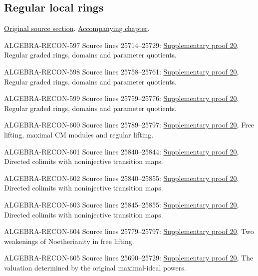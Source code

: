 \subsection{Regular local rings}
\hypertarget{algebra-source-section-regular}{}
\noindent\href{https://github.com/stacks/stacks-project/blob/a04446e57ec1fbc252a871afcec7752fb2807b14/algebra.tex\#L25679}{Original source section}. \href{algebra.pdf\#nameddest=section-regular}{Accompanying chapter}.

\begin{AlgebraSourceRoutes}
\item[ALGEBRA-RECON-597] Source lines 25714--25729: \hyperlink{algebra_catenary_regular_notes_20260928}{Supplementary proof 20}, Regular graded rings, domains and parameter quotients.
\item[ALGEBRA-RECON-598] Source lines 25758--25761: \hyperlink{algebra_catenary_regular_notes_20260928}{Supplementary proof 20}, Regular graded rings, domains and parameter quotients.
\item[ALGEBRA-RECON-599] Source lines 25759--25776: \hyperlink{algebra_catenary_regular_notes_20260928}{Supplementary proof 20}, Regular graded rings, domains and parameter quotients.
\item[ALGEBRA-RECON-600] Source lines 25789--25797: \hyperlink{algebra_catenary_regular_notes_20260928}{Supplementary proof 20}, Free lifting, maximal CM modules and regular lifting.
\item[ALGEBRA-RECON-601] Source lines 25840--25844: \hyperlink{algebra_catenary_regular_notes_20260928}{Supplementary proof 20}, Directed colimits with noninjective transition maps.
\item[ALGEBRA-RECON-602] Source lines 25840--25855: \hyperlink{algebra_catenary_regular_notes_20260928}{Supplementary proof 20}, Directed colimits with noninjective transition maps.
\item[ALGEBRA-RECON-603] Source lines 25845--25855: \hyperlink{algebra_catenary_regular_notes_20260928}{Supplementary proof 20}, Directed colimits with noninjective transition maps.
\item[ALGEBRA-RECON-604] Source lines 25779--25797: \hyperlink{algebra_catenary_regular_notes_20260928}{Supplementary proof 20}, Two weakenings of Noetherianity in free lifting.
\item[ALGEBRA-RECON-605] Source lines 25690--25729: \hyperlink{algebra_catenary_regular_notes_20260928}{Supplementary proof 20}, The valuation determined by the original maximal-ideal powers.
\end{AlgebraSourceRoutes}

